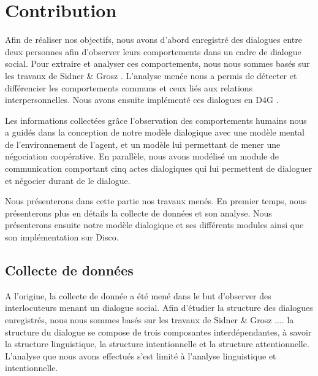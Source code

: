 \documentclass[a4paper,french]{article}
\begin{document}
\section{Contribution}
\label{contribution}

\par Afin de réaliser nos objectifs, nous avons d'abord enregistré des dialogues entre deux personnes afin d'observer leurs comportements dans un cadre de dialogue social. 
Pour extraire et analyser ces comportements, nous nous sommes basés sur les travaux de Sidner \& Grosz \cite{grosz1986attention}. L'analyse menée nous a permis de détecter et différencier les comportements communs et ceux liés aux relations interpersonnelles. Nous avons ensuite implémenté ces dialogues en D4G \cite{rich}. 
\par Les informations collectées grâce l'observation des comportements humains nous a guidés dans la conception de notre modèle dialogique avec une modèle mental de l'environnement de l'agent, et un modèle lui permettant de mener une négociation coopérative. 
En parallèle, nous avons modélisé un module de communication comportant cinq actes dialogiques qui lui permettent de dialoguer et négocier durant de le dialogue. 
\par Nous présenterons dans cette partie nos travaux menés. En premier temps, nous présenterons plus en détails la collecte de données et son analyse. 
	Nous présenterons ensuite notre modèle dialogique et ses différents modules ainsi que son implémentation sur Disco. 
\subsection{Collecte de données}
\par A l'origine, la collecte de donnée a été mené dans le but d'observer des interlocuteurs menant un dialogue social. Afin d'étudier la structure des dialogues enregistrés, nous nous sommes basés sur les travaux de Sidner \& Grosz \cite{grosz1986attention}  ....  la structure du dialogue se compose de trois composantes interdépendantes, à savoir la structure linguistique, la structure intentionnelle et la structure attentionnelle. L'analyse que nous avons effectués s'est limité à l'analyse linguistique et intentionnelle. 
\end{document}
